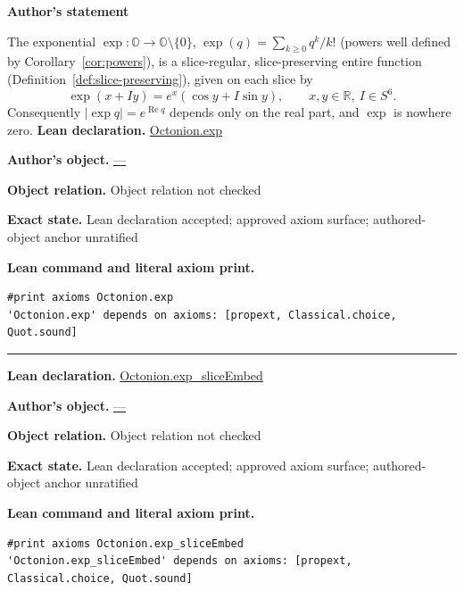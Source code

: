 \documentclass[11pt]{article}
\newcommand{\OO}{\mathbb{O}}
\newcommand{\RR}{\mathbb{R}}
\DeclareMathOperator{\re}{Re}
\theoremstyle{plain}
\theoremstyle{definition}
\theoremstyle{remark}
\begin{document}
\medskip
\begin{tcolorbox}[provenancecard,title={23. Theorem - The slice exponential; \textbackslash{}protect\{\textbackslash{}cite[\textbackslash{}S3]\{GPVwind\}; \textbackslash{}cite[Prop.\textasciitilde{}5.1]\{VS\}; \textbackslash{}cite[Rem.\textasciitilde{}2.23]\{AdF\}\}},title after break={23. Theorem - The slice exponential; \textbackslash{}protect\{\textbackslash{}cite[\textbackslash{}S3]\{GPVwind\}; \textbackslash{}cite[Prop.\textasciitilde{}5.1]\{VS\}; \textbackslash{}cite[Rem.\textasciitilde{}2.23]\{AdF\}\} (continued)}]
\textbf{Author's statement}\par
The exponential $\exp:\OO\to\OO\setminus\{0\}$, $\exp(q)=\sum_{k\ge0}q^{k}/k!$ (powers well defined by Corollary~\ref{cor:powers}), is a
slice-regular, slice-preserving entire function (Definition~\ref{def:slice-preserving}),
given on each slice by
\[
\exp(x+Iy)=e^{x}(\cos y+I\sin y),\qquad x,y\in\RR,\ I\in S^6 .
\]
Consequently $|\exp q|=e^{\re q}$ depends only on the real part, and $\exp$ is nowhere zero.
\tcblower
\textbf{Lean declaration.} \url{Octonion.exp}
\par\textbf{Author's object.} \url{—}
\par\textbf{Object relation.} Object relation not checked
\par\textbf{Exact state.} Lean declaration accepted; approved axiom surface; authored-object anchor unratified
\par\smallskip\textbf{Lean command and literal axiom print.}
\begin{Verbatim}[breaklines=true,breakanywhere=true,fontsize=\small]
#print axioms Octonion.exp
'Octonion.exp' depends on axioms: [propext, Classical.choice, Quot.sound]
\end{Verbatim}
\medskip\hrule\medskip
\textbf{Lean declaration.} \url{Octonion.exp_sliceEmbed}
\par\textbf{Author's object.} \url{—}
\par\textbf{Object relation.} Object relation not checked
\par\textbf{Exact state.} Lean declaration accepted; approved axiom surface; authored-object anchor unratified
\par\smallskip\textbf{Lean command and literal axiom print.}
\begin{Verbatim}[breaklines=true,breakanywhere=true,fontsize=\small]
#print axioms Octonion.exp_sliceEmbed
'Octonion.exp_sliceEmbed' depends on axioms: [propext, Classical.choice, Quot.sound]
\end{Verbatim}

\end{tcolorbox}
\end{document}
